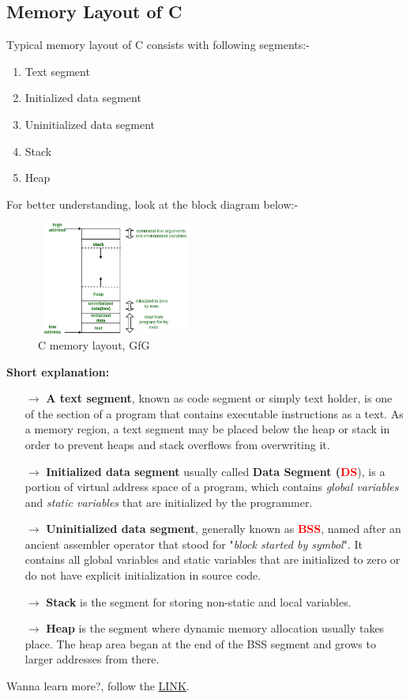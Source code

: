 \subsection{Memory Layout of C}
Typical memory layout of C consists with following segments:-
\begin{enumerate}
	\item Text segment
	\item Initialized data segment
	\item Uninitialized data segment
	\item Stack
	\item Heap
\end{enumerate}
For better understanding, look at the block diagram below:-\\
\begin{figure}
	\centering
	\includegraphics[width=200px, height=140px]{Source Images/C memory layout, GfG.png} 
	\caption{C memory layout, GfG}
\end{figure}
\pagebreak

\textbf{Short explanation:}
\begin{itemize}
	\item[$\rightarrow$] \textbf{A text segment}, known as code segment or simply text holder, is one of the section of a program that contains executable instructions as a text. As a memory region, a text segment may be placed below the heap or stack in order to prevent heaps and stack overflows from overwriting it.
	\item[$\rightarrow$] \textbf{Initialized data segment} usually called \textbf{Data Segment (\textcolor{red}{DS}}), is a portion of virtual address space of a program, which contains \textit{global variables} and \textit{static variables} that are initialized by the programmer.
	\item[$\rightarrow$] \textbf{Uninitialized data segment}, generally known as \textbf{\textcolor{red}{BSS}}, named after an ancient assembler operator that stood for "\textit{block started by symbol}". It contains all global variables and static variables that are initialized to zero or do not have explicit initialization in source code.
	\item[$\rightarrow$] \textbf{Stack} is the segment for storing non-static and local variables.
	\item[$\rightarrow$] \textbf{Heap} is the segment where dynamic memory allocation usually takes place. The heap area began at the end of the BSS segment and grows to larger addresses from there.
\end{itemize}
Wanna learn more?, follow the \href{https://www.geeksforgeeks.org/memory-layout-of-c-program/}{LINK}.

